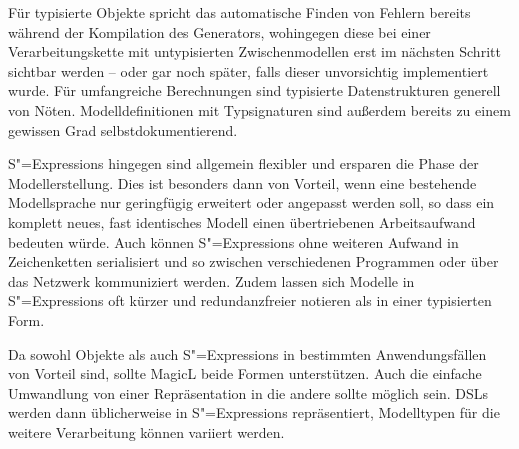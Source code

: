 \documentclass[11pt, a4paper, bibgerm]{scrbook}
\newcommand{\sexps}{S"=Expressions}
\begin{document}
Für typisierte Objekte spricht das automatische Finden von Fehlern
bereits während der Kompilation des Generators, wohingegen diese bei
einer Verarbeitungskette mit untypisierten Zwischenmodellen erst im
nächsten Schritt sichtbar werden -- oder gar noch später,
falls dieser unvorsichtig implementiert wurde. Für umfangreiche
Berechnungen sind typisierte Datenstrukturen generell
von Nöten. Modelldefinitionen mit Typsignaturen sind außerdem bereits zu
einem gewissen Grad selbstdokumentierend.

\sexps{} hingegen sind allgemein flexibler und ersparen die Phase der
Modellerstellung. Dies ist besonders dann von Vorteil, wenn eine
bestehende Modellsprache nur geringfügig erweitert oder angepasst werden
soll, so dass ein komplett neues, fast identisches Modell einen
übertriebenen Arbeitsaufwand bedeuten würde. Auch können \sexps{} ohne
weiteren Aufwand in Zeichenketten serialisiert und so zwischen
verschiedenen Programmen oder über das Netzwerk kommuniziert
werden. Zudem lassen sich Modelle in \sexps{} oft kürzer und
redundanzfreier notieren als in einer typisierten Form.

Da sowohl Objekte als auch \sexps{} in bestimmten Anwendungsfällen von
Vorteil sind, sollte MagicL beide Formen unterstützen. Auch die
einfache Umwandlung von einer Repräsentation in die andere sollte
möglich sein. DSLs werden dann üblicherweise in \sexps{}
repräsentiert, Modelltypen für die weitere Verarbeitung können variiert
werden.
\end{document}
